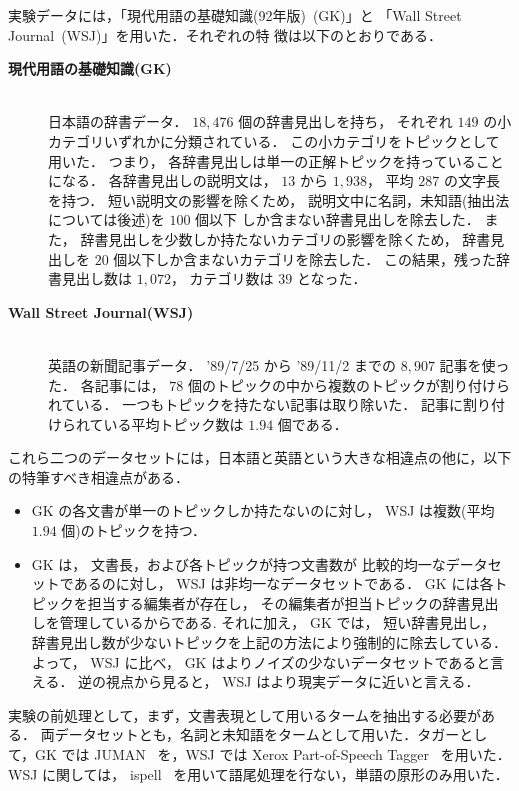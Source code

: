 実験データには，「現代用語の基礎知識(92年版)~\cite{gk/92/a}(GK)」と
「Wall Street Journal~\cite{liberman:91:a}(WSJ)」を用いた．それぞれの特
徴は以下のとおりである．
\begin{description}
 \item[{\gt\bf 現代用語の基礎知識(GK)}]\strut\\
	    日本語の辞書データ．
	    $18,476$ 個の辞書見出しを持ち，
	    それぞれ $149$ の小カテゴリいずれかに分類されている．
	    この小カテゴリをトピックとして用いた．
	    つまり，
	    各辞書見出しは単一の正解トピックを持っていることになる．
	    各辞書見出しの説明文は，
	    $13$ から $1,938$，
	    平均 $287$ の文字長を持つ．
	    短い説明文の影響を除くため，
	    説明文中に名詞，未知語(抽出法については後述)を $100$ 個以下
	    しか含まない辞書見出しを除去した．
	    また，
	    辞書見出しを少数しか持たないカテゴリの影響を除くため，
	    辞書見出しを $20$ 個以下しか含まないカテゴリを除去した．
	    この結果，残った辞書見出し数は $1,072$，
	    カテゴリ数は $39$ となった．
 \item[{\gt\bf Wall Street Journal(WSJ)}]\strut\\
	    英語の新聞記事データ．
	    '89/7/25 から '89/11/2 までの $8,907$ 記事を使った．
	    各記事には，
	    $78$ 個のトピックの中から複数のトピックが割り付けられている．
	    一つもトピックを持たない記事は取り除いた．
	    記事に割り付けられている平均トピック数は $1.94$ 個である．
\end{description}

これら二つのデータセットには，日本語と英語という大きな相違点の他に，以下
の特筆すべき相違点がある．
\begin{itemize}
 \item GK の各文書が単一のトピックしか持たないのに対し，
       WSJ は複数(平均 $1.94$ 個)のトピックを持つ．
 \item GK は，
       文書長，および各トピックが持つ文書数が
       比較的均一なデータセットであるのに対し，
       WSJ は非均一なデータセットである．
       GK には各トピックを担当する編集者が存在し，
       その編集者が担当トピックの辞書見出しを管理しているからである.
       それに加え，
       GK では，
       短い辞書見出し，
       辞書見出し数が少ないトピックを上記の方法により強制的に除去している．
       よって，
       WSJ に比べ，
       GK はよりノイズの少ないデータセットであると言える．
       逆の視点から見ると，
       WSJ はより現実データに近いと言える．
\end{itemize}

実験の前処理として，まず，文書表現として用いるタームを抽出する必要がある．
両データセットとも，名詞と未知語をタームとして用いた．タガーとして，GK 
では JUMAN~\cite{juman/94/a} を，WSJ では Xerox Part-of-Speech
Tagger~\cite{cutting:93:a} を用いた．WSJ に関しては，
ispell~\cite{ispell} を用いて語尾処理を行ない，単語の原形のみ用いた．

